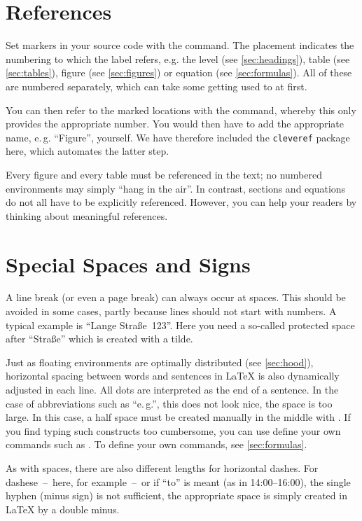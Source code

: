 \section{References}
\label{sec:references}
Set markers in your source code with the  command. The placement
indicates the numbering to which the label refers, e.g. the level (see
\cref{sec:headings}), table (see \cref{sec:tables}), figure (see 
\cref{sec:figures}) or equation (see \cref{sec:formulas}). All of these are
numbered separately, which can take some getting used to at first.

You can then refer to the marked locations with the  command, whereby 
this only provides the appropriate number. You would then have to add the 
appropriate name, e.\,g. \enquote{Figure}, yourself. We have therefore included 
the \texttt{cleveref} package here, which automates the latter step.

Every figure and every table must be referenced in the text; no numbered
environments may simply \enquote{hang in the air}. In contrast, sections and 
equations do not all have to be explicitly referenced. However, you can help 
your readers by thinking about meaningful references.

\section{Special Spaces and Signs}
\label{sec:specialCases}
A line break (or even a page break) can always occur at spaces. This should be 
avoided in some cases, partly because lines should not start with numbers. A 
typical example is \enquote{Lange Straße~123}. Here you need a so-called 
protected space after \enquote{Straße} which is created with a tilde.

Just as floating environments are optimally distributed (see \cref{sec:hood}), 
horizontal spacing between words and sentences in \LaTeX{} is also dynamically 
adjusted in each line. All dots are interpreted as the end of a sentence. In the 
case of abbreviations such as \enquote{e.\,g.}, this does not look nice, the 
space is too large. In this case, a half space must be created manually in the 
middle with \comm{,}. If you find typing such constructs too cumbersome, you can 
use define your own commands such as . To define your own commands, see 
\cref{sec:formulas}.

As with spaces, there are also different lengths for horizontal dashes. For 
dashese~--~here, for example~--~or if \enquote{to} is meant (as in 
14:00--16:00), the single hyphen (minus sign) is not sufficient, the appropriate 
space is simply created in \LaTeX{} by a double minus.

